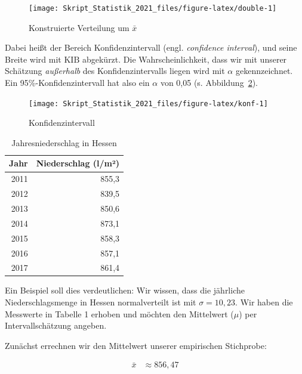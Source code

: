 \documentclass[
  11pt,
  ngerman,
  a4paper,
]{report}
\begin{document}
\begin{figure}[!h]

{\centering \texttt{[image: Skript\_Statistik\_2021\_files/figure-latex/double-1]} 

}

\caption{Konstruierte Verteilung um $\bar{x}$}\label{fig:double}
\end{figure}

Dabei heißt der Bereich Konfidenzintervall (engl. \emph{confidence interval}), und seine Breite wird mit \(\textrm{KIB}\) abgekürzt. Die Wahrscheinlichkeit, dass wir mit unserer Schätzung \emph{außerhalb} des Konfidenzintervalls liegen wird mit \(\alpha\) gekennzeichnet. Ein 95\%-Konfidenzintervall hat also ein \(\alpha\) von 0,05 (s. Abbildung~\ref{fig:konf}).

\begin{figure}[!h]

{\centering \texttt{[image: Skript\_Statistik\_2021\_files/figure-latex/konf-1]} 

}

\caption{Konfidenzintervall}\label{fig:konf}
\end{figure}

\begin{table}

\caption{\label{tab:tab}Jahresniederschlag in Hessen}
\centering
\begin{tabular}[t]{rr}
\toprule
Jahr & Niederschlag (l/m²)\\
\midrule
2011 & 855,3\\
2012 & 839,5\\
2013 & 850,6\\
2014 & 873,1\\
2015 & 858,3\\
2016 & 857,1\\
2017 & 861,4\\
\bottomrule
\end{tabular}
\end{table}

Ein Beispiel soll dies verdeutlichen: Wir wissen, dass die jährliche Niederschlagsmenge in Hessen normalverteilt ist mit \(\sigma=10{,}23\). Wir haben die Messwerte in Tabelle 1 erhoben und möchten den Mittelwert (\(\mu\)) per Intervallschätzung angeben.

Zunächst errechnen wir den Mittelwert unserer empirischen Stichprobe:

\nopagebreak

\[
\begin{aligned}
  \bar{x}&\approx856{,}47
\end{aligned}
\]
\end{document}
